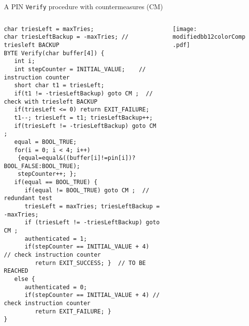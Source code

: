 \begin{frame}[fragile]{A PIN {\tt Verify} procedure with countermeasures (CM)}
\begin{columns}[t]
    \begin{column}{0.70\textwidth}\vspace{-21em}
\begin{tiny}
\begin{lstlisting}[basicstyle=\tiny\ttfamily,
]
char triesLeft = maxTries; 
char triesLeftBackup = -maxTries; // triesleft BACKUP
BYTE Verify(char buffer[4]) {
   int i;
   int stepCounter = INITIAL_VALUE;	   // instruction counter
   short char t1 = triesLeft;
   if(t1 != -triesLeftBackup) goto CM ;  // check with triesleft BACKUP
   if(triesLeft <= 0) return EXIT_FAILURE;
   t1--; triesLeft = t1; triesLeftBackup++;
   if(triesLeft != -triesLeftBackup) goto CM ;
   equal = BOOL_TRUE;
   for(i = 0; i < 4; i++)
    {equal=equal&((buffer[i]!=pin[i])?BOOL_FALSE:BOOL_TRUE);
    stepCounter++; };
   if(equal == BOOL_TRUE) {
      if(equal != BOOL_TRUE) goto CM ;  // redundant test
      triesLeft = maxTries; triesLeftBackup = -maxTries;
      if (triesLeft != -triesLeftBackup) goto CM ;
      authenticated = 1;
      if(stepCounter == INITIAL_VALUE + 4)  // check instruction counter
         return EXIT_SUCCESS; }  // TO BE REACHED
   else { 
      authenticated = 0;
      if(stepCounter == INITIAL_VALUE + 4) // check instruction counter
         return EXIT_FAILURE; }
}
\end{lstlisting}
\end{tiny}
\end{column}
\begin{column}{0.3\textwidth}
\texttt{[image: modifiedbb12colorComp.pdf]} 
\end{column}
\end{columns}
\end{frame}
%
